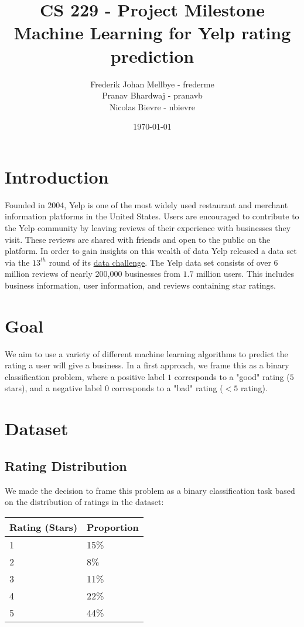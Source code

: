 \documentclass[letterpaper, 11pt]{article}
\title{CS 229 - Project Milestone \\ Machine Learning for Yelp rating prediction}
\author{Frederik Johan Mellbye - frederme\\Pranav Bhardwaj - pranavb\\Nicolas Bievre - nbievre}
\date{\today}
\begin{document}
\maketitle

\section{Introduction}

Founded in 2004, Yelp is one of the most widely used restaurant and merchant information platforms in the United States. Users are encouraged to contribute to the Yelp community by leaving reviews of their experience with businesses they visit. These reviews are shared with friends and open to the public on the platform. In order to gain insights on this wealth of data Yelp released a data set via the $13^{th}$ round of its \href{https://www.yelp.com/dataset/challenge}{data challenge}. The Yelp data set consists of over $6$ million reviews of nearly 200,000 businesses from $1.7$ million users. This includes business information, user information, and reviews containing star ratings.

\section{Goal}

We aim to use a variety of different machine learning algorithms to predict the rating a user will give a business. In a first approach, we frame this as a binary classification problem, where a positive label $1$ corresponds to a "good" rating ($5$ stars), and a negative label $0$ corresponds to a "bad" rating ($<5$ rating).

\section{Dataset}

\subsection{Rating Distribution}

We made the decision to frame this problem as a binary classification task based on the distribution of ratings in the dataset:

\begin{center}
    \begin{tabular}{ll}
    \hline
\textbf{Rating (Stars)} & \textbf{Proportion} \\
\hline
1              & 15\%       \\
2              & 8\%        \\
3              & 11\%       \\
4              & 22\%       \\
5              & 44\%
\end{tabular}
\end{center}
\end{document}
